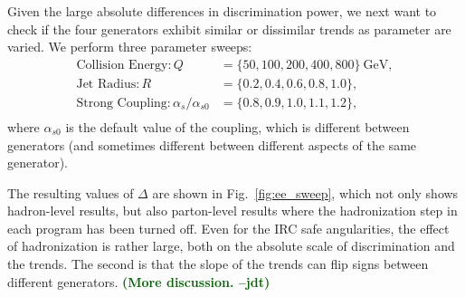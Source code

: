\documentclass[11pt,letterpaper]{article}
\newcommand{\GeV}{\text{GeV}}
\DeclareRobustCommand{\Fig}[1]{Fig.~\ref{#1}}
\newcommand{\be}{\begin{equation}}
\newcommand{\ee}{\end{equation}}
\newcommand{\jdt}[1]{\textbf{\textcolor{darkgreen}{(#1 --jdt)}}}
\begin{document}
Given the large absolute differences in discrimination power, we next want to check if the four generators exhibit similar or dissimilar trends as parameter are varied.  We perform three parameter sweeps:
\be
\begin{aligned}
\text{Collision Energy}: Q &= \{ 50, 100, 200, 400, 800\}~\GeV, \\
\text{Jet Radius}: R &= \{ 0.2, 0.4, 0.6, 0.8, 1.0\}, \\
\text{Strong Coupling}: \alpha_s / \alpha_{s0} &= \{0.8,0.9,1.0,1.1,1.2\}, \\
\end{aligned}
\ee
where $\alpha_{s0}$ is the default value of the coupling, which is different between generators (and sometimes different between different aspects of the same generator).

The resulting values of $\Delta$ are shown in \Fig{fig:ee_sweep}, which not only shows hadron-level results, but also parton-level results where the hadronization step in each program has been turned off.  Even for the IRC safe angularities, the effect of hadronization is rather large, both on the absolute scale of discrimination and the trends.  The second is that the slope of the trends can flip signs between different generators.  \jdt{More discussion.}
\end{document}
